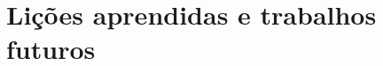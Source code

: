 \documentclass[11pt,twoside,a4paper]{book}
\begin{document}














\section{Lições aprendidas e trabalhos futuros}
\label{sec:licoes_e_futuro}
\end{document}
